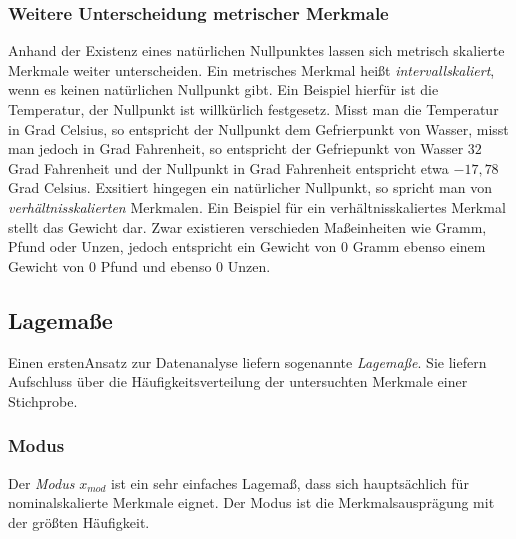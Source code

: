\documentclass[a4paper]{scrartcl}
\begin{document}
\begin{multicols}{2}
                    \subsubsection{Weitere Unterscheidung metrischer Merkmale}
                        Anhand der Existenz eines natürlichen Nullpunktes lassen sich metrisch skalierte Merkmale weiter unterscheiden. Ein metrisches Merkmal heißt \emph{intervallskaliert}, wenn es keinen natürlichen Nullpunkt gibt. \cite{kohn2005} Ein Beispiel hierfür ist die Temperatur, der Nullpunkt ist willkürlich festgesetz. Misst man die Temperatur in Grad Celsius, so entspricht der Nullpunkt dem Gefrierpunkt von Wasser, misst man jedoch in Grad Fahrenheit, so entspricht der Gefriepunkt von Wasser $32$ Grad Fahrenheit und der Nullpunkt in Grad Fahrenheit entspricht etwa $-17,78$ Grad Celsius.
                        \newline
                        Exsitiert hingegen ein natürlicher Nullpunkt, so spricht man von \emph{verhältnisskalierten} Merkmalen. \cite{kohn2005}
                        \newline
                        Ein Beispiel für ein verhältnisskaliertes Merkmal stellt das Gewicht dar. Zwar existieren verschieden Maßeinheiten wie Gramm, Pfund oder Unzen, jedoch entspricht ein Gewicht von $0$ Gramm ebenso einem Gewicht von $0$ Pfund und ebenso $0$ Unzen.
                
                \subsection{Lagemaße}
                    Einen erstenAnsatz zur Datenanalyse liefern sogenannte \emph{Lagemaße}. Sie liefern Aufschluss über die Häufigkeitsverteilung der untersuchten Merkmale einer Stichprobe. \cite{kohn2005}
                    \subsubsection{Modus}
                        Der \emph{Modus} $x_{mod}$ ist ein sehr einfaches Lagemaß, dass sich hauptsächlich für nominalskalierte Merkmale eignet. Der Modus ist die Merkmalsausprägung mit der größten Häufigkeit. \cite{kohn2005}

\end{multicols}
\end{document}
